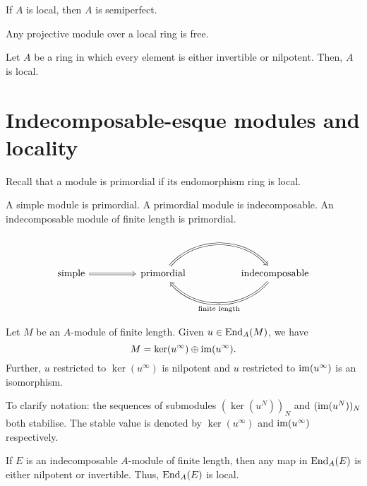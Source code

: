 \documentclass[12pt]{article}
\begin{document}
\begin{thm}
	If $A$ is local, then $A$ is semiperfect.
\end{thm}

\begin{thm}[Kaplansky]
	Any projective module over a local ring is free.
\end{thm}

\begin{thm} \label{thm:invertible-or-nilpotent-is-local}
	Let $A$ be a ring in which every element is either invertible or nilpotent. 
	Then, $A$ is local.
\end{thm}

\section{Indecomposable-esque modules and locality}

Recall that a module is primordial if its endomorphism ring is local.
\begin{thm}
	A simple module is primordial. \newline
	A primordial module is indecomposable. \newline
	An indecomposable module of finite length is primordial.
\end{thm}

\begin{equation*} 
	\begin{tikzcd}
	\text{simple} \arrow[rr, Rightarrow] && \text{primordial} \arrow[rr, Rightarrow, bend left=49] &  & \text{indecomposable}  \arrow[ll, "\text{finite length}", Rightarrow, bend left=49]
\end{tikzcd}
\end{equation*}

\begin{lem}[Fitting] 
	Let $M$ be an $A$-module of finite length. 
	Given $u \in \operatorname{End}_{A}(M)$, we have
	\begin{equation*} 
		M = \ker(u^{\infty}) \oplus \operatorname{im}(u^{\infty}).
	\end{equation*}
	Further, $u$ restricted to $\ker(u^{\infty})$ is nilpotent and $u$ restricted to $\operatorname{im}(u^{\infty})$ is an isomorphism.
\end{lem}
To clarify notation: the sequences of submodules $(\ker(u^{N}))_{N}$ and $(\operatorname{im}(u^{N}))_{N}$ both stabilise. 
The stable value is denoted by $\ker(u^{\infty})$ and $\operatorname{im}(u^{\infty})$ respectively.

\begin{cor}
	If $E$ is an indecomposable $A$-module of finite length, then any map in $\operatorname{End}_{A}(E)$ is either nilpotent or invertible. 
	Thus, $\operatorname{End}_{A}(E)$ is local.
\end{cor}
\end{document}
